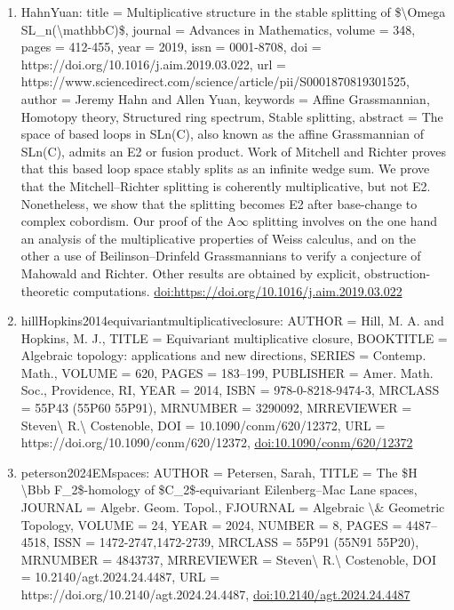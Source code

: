 \documentclass[11pt]{article}
\begin{document}
\begin{enumerate}[leftmargin=*]
  \item HahnYuan: title = Multiplicative structure in the stable splitting of \$\textbackslash{}Omega SL\_n(\textbackslash{}mathbbC)\$, journal = Advances in Mathematics, volume = 348, pages = 412-455, year = 2019, issn = 0001-8708, doi = https://doi.org/10.1016/j.aim.2019.03.022, url = https://www.sciencedirect.com/science/article/pii/S0001870819301525, author = Jeremy Hahn and Allen Yuan, keywords = Affine Grassmannian, Homotopy theory, Structured ring spectrum, Stable splitting, abstract = The space of based loops in SLn(C), also known as the affine Grassmannian of SLn(C), admits an E2 or fusion product. Work of Mitchell and Richter proves that this based loop space stably splits as an infinite wedge sum. We prove that the Mitchell--Richter splitting is coherently multiplicative, but not E2. Nonetheless, we show that the splitting becomes E2 after base-change to complex cobordism. Our proof of the A\ensuremath{\infty} splitting involves on the one hand an analysis of the multiplicative properties of Weiss calculus, and on the other a use of Beilinson--Drinfeld Grassmannians to verify a conjecture of Mahowald and Richter. Other results are obtained by explicit, obstruction-theoretic computations. \href{https://doi.org/https://doi.org/10.1016/j.aim.2019.03.022}{doi:https://doi.org/10.1016/j.aim.2019.03.022}
  \item hillHopkins2014equivariantmultiplicativeclosure: AUTHOR = Hill, M. A. and Hopkins, M. J., TITLE = Equivariant multiplicative closure, BOOKTITLE = Algebraic topology: applications and new directions, SERIES = Contemp. Math., VOLUME = 620, PAGES = 183--199, PUBLISHER = Amer. Math. Soc., Providence, RI, YEAR = 2014, ISBN = 978-0-8218-9474-3, MRCLASS = 55P43 (55P60 55P91), MRNUMBER = 3290092, MRREVIEWER = Steven\textbackslash{} R.\textbackslash{} Costenoble, DOI = 10.1090/conm/620/12372, URL = https://doi.org/10.1090/conm/620/12372, \href{https://doi.org/10.1090/conm/620/12372}{doi:10.1090/conm/620/12372}
  \item peterson2024EMspaces: AUTHOR = Petersen, Sarah, TITLE = The \$H \textbackslash{}Bbb F\_2\$-homology of \$C\_2\$-equivariant Eilenberg--Mac Lane spaces, JOURNAL = Algebr. Geom. Topol., FJOURNAL = Algebraic \textbackslash{}\& Geometric Topology, VOLUME = 24, YEAR = 2024, NUMBER = 8, PAGES = 4487--4518, ISSN = 1472-2747,1472-2739, MRCLASS = 55P91 (55N91 55P20), MRNUMBER = 4843737, MRREVIEWER = Steven\textbackslash{} R.\textbackslash{} Costenoble, DOI = 10.2140/agt.2024.24.4487, URL = https://doi.org/10.2140/agt.2024.24.4487, \href{https://doi.org/10.2140/agt.2024.24.4487}{doi:10.2140/agt.2024.24.4487}

\end{enumerate}
\end{document}
